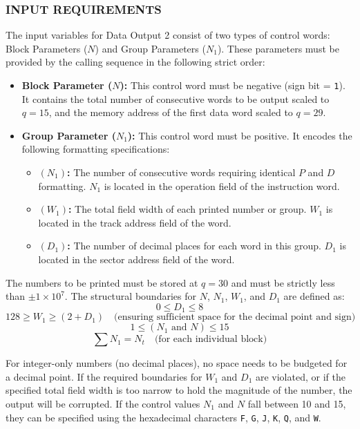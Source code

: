 \subsubsection*{INPUT REQUIREMENTS}
The input variables for Data Output 2 consist of two types of control words: Block Parameters ($N$) and Group Parameters ($N_1$). These parameters must be provided by the calling sequence in the following strict order:

\begin{itemize}
    \item \textbf{Block Parameter ($N$):} This control word must be negative (sign bit = \texttt{1}). It contains the total number of consecutive words to be output scaled to $q=15$, and the memory address of the first data word scaled to $q=29$.
    \item \textbf{Group Parameter ($N_1$):} This control word must be positive. It encodes the following formatting specifications:
    \begin{itemize}
        \item \textbf{$(N_1)$:} The number of consecutive words requiring identical $P$ and $D$ formatting. $N_1$ is located in the operation field of the instruction word.
        \item \textbf{$(W_1)$:} The total field width of each printed number or group. $W_1$ is located in the track address field of the word.
        \item \textbf{$(D_1)$:} The number of decimal places for each word in this group. $D_1$ is located in the sector address field of the word.
    \end{itemize}
\end{itemize}

The numbers to be printed must be stored at $q=30$ and must be strictly less than $\pm 1 \times 10^7$. The structural boundaries for $N$, $N_1$, $W_1$, and $D_1$ are defined as:
\[
0 \le D_1 \le 8
\]
\[
128 \ge W_1 \ge (2 + D_1) \quad \text{(ensuring sufficient space for the decimal point and sign)}
\]
\[
1 \le (N_1 \text{ and } N) \le 15
\]
\[
\sum N_1 = N_t \quad \text{(for each individual block)}
\]

For integer-only numbers (no decimal places), no space needs to be budgeted for a decimal point. If the required boundaries for $W_1$ and $D_1$ are violated, or if the specified total field width is too narrow to hold the magnitude of the number, the output will be corrupted. If the control values $N_1$ and $N$ fall between 10 and 15, they can be specified using the hexadecimal characters \texttt{F}, \texttt{G}, \texttt{J}, \texttt{K}, \texttt{Q}, and \texttt{W}.

